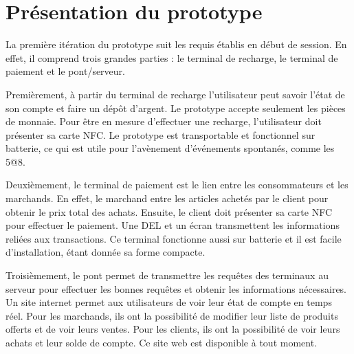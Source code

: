 \section{Présentation du prototype}
La première itération du prototype suit les requis établis en début de session. En effet, il comprend trois grandes parties : le terminal de recharge, le terminal de paiement et le pont/serveur.

Premièrement, à partir du terminal de recharge l’utilisateur peut savoir l’état de son compte et faire un dépôt d’argent. Le prototype accepte seulement les pièces de monnaie. Pour être en mesure d'effectuer une recharge, l’utilisateur doit présenter sa carte NFC. Le prototype est transportable et fonctionnel sur batterie, ce qui est utile pour l’avènement d'événements spontanés, comme les 5@8.

Deuxièmement, le terminal de paiement est le lien entre les consommateurs et les marchands. En effet, le marchand entre les articles achetés par le client pour obtenir le prix total des achats. Ensuite, le client doit présenter sa carte NFC pour effectuer le paiement. Une DEL et un écran transmettent les informations reliées aux transactions. Ce terminal fonctionne aussi sur batterie et il est facile d’installation, étant donnée sa forme compacte.

Troisièmement, le pont permet de transmettre les requêtes des terminaux au serveur pour effectuer les bonnes requêtes et obtenir les informations nécessaires. Un site internet permet aux utilisateurs de voir leur état de compte en temps réel. Pour les marchands, ils ont la possibilité de modifier leur liste de produits offerts et de voir leurs ventes. Pour les clients, ils ont la possibilité de voir leurs achats et leur solde de compte. Ce site web est disponible à tout moment.
